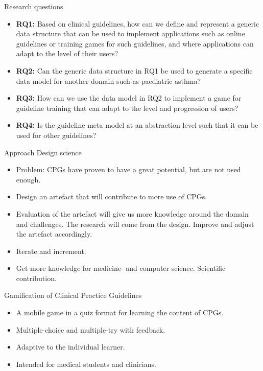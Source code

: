 \documentclass{beamer}
\begin{document}
\begin{frame}{Research questions}
\begin{itemize}
	\item \textbf{RQ1:} Based on clinical guidelines, how can we define and represent a generic data structure that can be used to implement applications such as online guidelines or training games for such guidelines, and where applications can adapt to the level of their users?
	\item \textbf{RQ2:} Can the generic data structure in RQ1 be used to generate a specific data model for another domain such as paediatric asthma?
	\item \textbf{RQ3:} How can we use the data model in RQ2 to implement a game for guideline training that can adapt to the level and progression  of users?
	\item \textbf{RQ4:} Is the guideline meta model at an abstraction level such that it can be used for other guidelines? 
\end{itemize}
\end{frame}


\begin{frame}{Approach}
Design science
\begin{itemize}
	\item Problem: CPGs have proven to have a great potential, but are not used enough.
	\item Design an artefact that will contribute to more use of CPGs.
	\item Evaluation of the artefact will give us more knowledge around the domain and challenges. The research will come from the design. Improve and adjust the artefact accordingly. 
	\item Iterate and increment.
	\item Get more knowledge for medicine- and computer science. Scientific contribution.
\end{itemize}
\end{frame}

\begin{frame}{Gamification of Clinical Practice Guidelines}
\begin{itemize}
	\item A mobile game in a quiz format for learning the content of CPGs.
	\item Multiple-choice and multiple-try with feedback.
	\item Adaptive to the individual learner.
	\item Intended for medical students and clinicians.
\end{itemize}
\end{frame}
\end{document}
